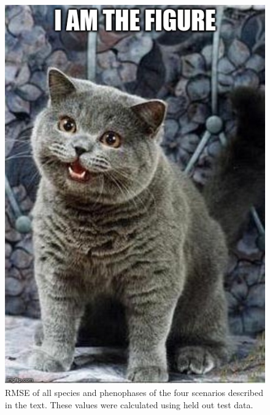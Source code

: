 \begin{figure}
	\centering
	\includegraphics[scale=0.5]{images/figure_filler.jpg}
	\caption[RMSE of all species and phenophases of the four scenarios described in the text]{RMSE of all species and phenophases of the four scenarios described in the text. These values were calculated using held out test data.} \label{fig-a-7}
\end{figure}

\newpage

